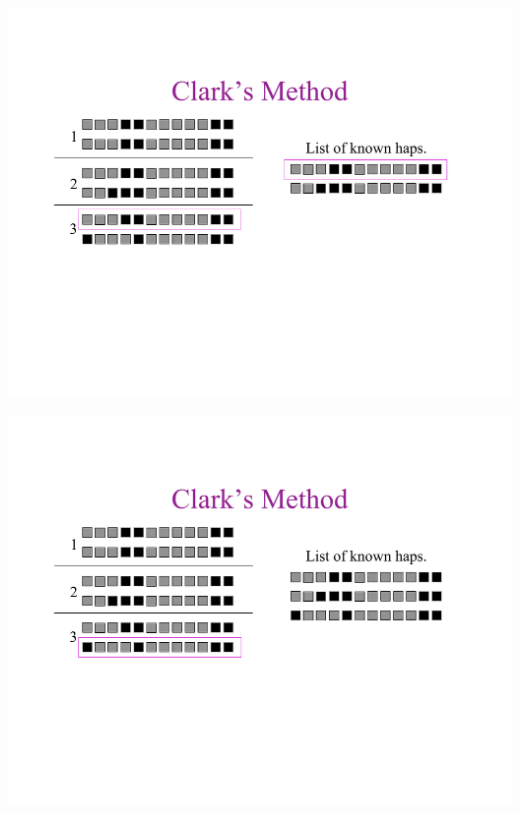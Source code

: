 \newslide{}
\mbox{}
\vspace*{\VertUp}
\enlargethispage*{1000pt}
\begin{center}
\includegraphics*[width=\textwidth]{PPT_pages/pg_0021.pdf}
\end{center}


\newslide{}
\mbox{}
\vspace*{\VertUp}
\enlargethispage*{1000pt}
\begin{center}
\includegraphics*[width=\textwidth]{PPT_pages/pg_0022.pdf}
\end{center}


